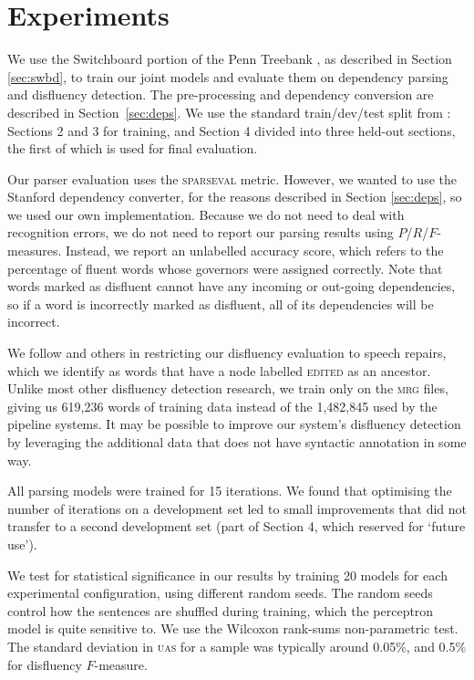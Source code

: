 \documentclass[11pt,letterpaper]{article}
\newcommand{\sparseval}{\textsc{sparseval}\xspace}
\begin{document}
\section{Experiments}

We use the Switchboard portion of the Penn Treebank \citep{marcus:93}, as
described in Section \ref{sec:swbd}, to train our joint
models and evaluate them on dependency parsing and disfluency detection. The
pre-processing and dependency conversion are described in Section~\ref{sec:deps}.
We use the standard train/dev/test split from \citet{Charniak01a}: Sections 2
and 3 for training, and Section 4 divided into three held-out sections, the first
of which is used for final evaluation.

Our parser evaluation uses the \sparseval \citep{sparseval} metric.
However, we wanted to use the Stanford dependency converter, for the 
reasons described in Section \ref{sec:deps}, so we
used our own implementation.
Because we do not need to deal with recognition
errors, we do not need to report our parsing results using $P$/$R$/$F$-measures.
Instead, we report an unlabelled accuracy score, which refers to the percentage
of fluent words whose governors were assigned correctly.  Note that words marked
as disfluent cannot have any incoming or out-going dependencies, so if a word is
incorrectly marked as disfluent, all of its dependencies will be incorrect.

We follow \citet{Johnson04a} and others in restricting our disfluency evaluation
to speech repairs, which we identify as words that have a node labelled \textsc{edited}
as an ancestor.  Unlike most other disfluency detection research, we train only
on the \textsc{mrg} files, giving us 619,236 words of training data instead of
the 1,482,845 used by the pipeline systems.  It may be possible to improve our
system's disfluency detection by leveraging the additional data that does not
have syntactic annotation in some way.

All parsing models were trained for 15 iterations.
We found that optimising the number of iterations on a development set led to
small improvements that did not transfer to a second development set (part of
Section 4, which \citet{Charniak01a} reserved for `future use').

We test for statistical significance in our results by training 20 models for
each experimental configuration, using different random seeds. The random seeds
control how the sentences are shuffled during training, which the perceptron
model is quite sensitive to.  We use the Wilcoxon rank-sums non-parametric test.
The standard deviation in \textsc{uas} for a sample was typically around 0.05\%,
and 0.5\% for disfluency $F$-measure.
\end{document}
